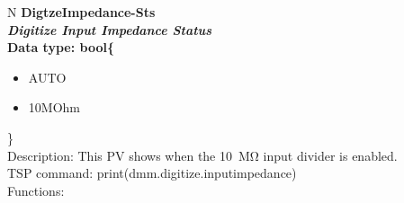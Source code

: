 \documentclass[openany]{article}
\begin{document}
		\begin{tabular}{N}
			\hline
			\bfseries DigtzeImpedance-Sts\label{pv:digtzeimpedance-sts} \\ \hline
			\emph{Digitize Input Impedance Status} \\
			Data type: bool\{\begin{itemize}[noitemsep]
				\small
				\item[] AUTO
				\item[] 10MOhm
			\end{itemize}\} \\
			Description: This PV shows when the \SI{10}{\mega\ohm} input divider is enabled. \\
			TSP command: print(dmm.digitize.inputimpedance) \\
			Functions: \\
			\arrayrulecolor{\FuncTableBorderColor}

		\end{tabular}
\end{document}

